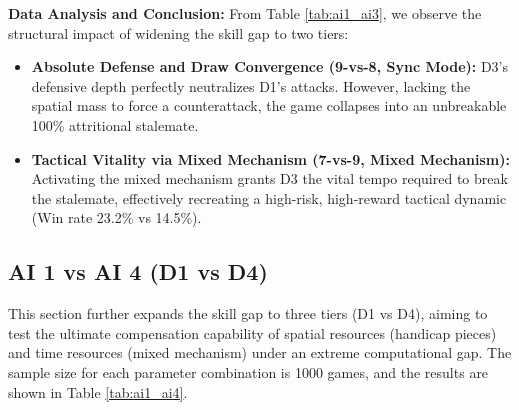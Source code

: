 \textbf{Data Analysis and Conclusion:} 
From Table \ref{tab:ai1_ai3}, we observe the structural impact of widening the skill gap to two tiers:
\begin{itemize}
    \item \textbf{Absolute Defense and Draw Convergence (9-vs-8, Sync Mode):} D3's defensive depth perfectly neutralizes D1's attacks. However, lacking the spatial mass to force a counterattack, the game collapses into an unbreakable 100\% attritional stalemate.
    \item \textbf{Tactical Vitality via Mixed Mechanism (7-vs-9, Mixed Mechanism):} Activating the mixed mechanism grants D3 the vital tempo required to break the stalemate, effectively recreating a high-risk, high-reward tactical dynamic (Win rate 23.2\% vs 14.5\%).
\end{itemize}
    
\subsection{AI 1 vs AI 4 (D1 vs D4)}
\label{subsec:ai1_ai4}

This section further expands the skill gap to three tiers (D1 vs D4), aiming to test the ultimate compensation capability of spatial resources (handicap pieces) and time resources (mixed mechanism) under an extreme computational gap. The sample size for each parameter combination is 1000 games, and the results are shown in Table \ref{tab:ai1_ai4}.

\begin{table}[htbp]
    \centering
    \caption{AI 1 vs AI 4 Simulation Data Distribution (Sample Size=1000)}
    \label{tab:ai1_ai4}
\end{table}


